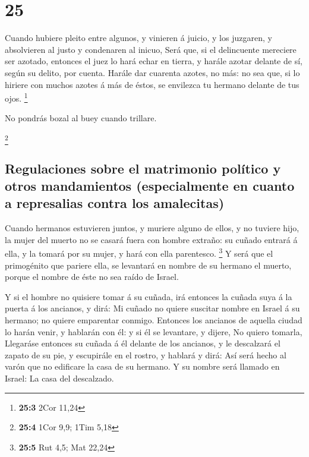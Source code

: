 \hypertarget{section-24}{%
\section{25}\label{section-24}}

 Cuando hubiere pleito entre algunos, y vinieren á juicio, y
los juzgaren, y absolvieren al justo y condenaren al inicuo,
 Será que, si el delincuente mereciere ser azotado, entonces
el juez lo hará echar en tierra, y harále azotar delante de sí, según su
delito, por cuenta.  Harále dar cuarenta azotes, no más: no
sea que, si lo hiriere con muchos azotes á más de éstos, se envilezca tu
hermano delante de tus ojos. \footnote{\textbf{25:3} 2Cor 11,24}

 No pondrás bozal al buey cuando trillare.

\footnote{\textbf{25:4} 1Cor 9,9; 1Tim 5,18}

\hypertarget{regulaciones-sobre-el-matrimonio-poluxedtico-y-otros-mandamientos-especialmente-en-cuanto-a-represalias-contra-los-amalecitas}{%
\subsection{Regulaciones sobre el matrimonio político y otros
mandamientos (especialmente en cuanto a represalias contra los
amalecitas)}\label{regulaciones-sobre-el-matrimonio-poluxedtico-y-otros-mandamientos-especialmente-en-cuanto-a-represalias-contra-los-amalecitas}}

 Cuando hermanos estuvieren juntos, y muriere alguno de
ellos, y no tuviere hijo, la mujer del muerto no se casará fuera con
hombre extraño: su cuñado entrará á ella, y la tomará por su mujer, y
hará con ella parentesco. \footnote{\textbf{25:5} Rut 4,5; Mat 22,24}
 Y será que el primogénito que pariere ella, se levantará en
nombre de su hermano el muerto, porque el nombre de éste no sea raído de
Israel.

 Y si el hombre no quisiere tomar á su cuñada, irá entonces
la cuñada suya á la puerta á los ancianos, y dirá: Mi cuñado no quiere
suscitar nombre en Israel á su hermano; no quiere emparentar conmigo.
 Entonces los ancianos de aquella ciudad lo harán venir, y
hablarán con él: y si él se levantare, y dijere, No quiero tomarla,
 Llegaráse entonces su cuñada á él delante de los ancianos,
y le descalzará el zapato de su pie, y escupirále en el rostro, y
hablará y dirá: Así será hecho al varón que no edificare la casa de su
hermano.  Y su nombre será llamado en Israel: La casa del
descalzado.

